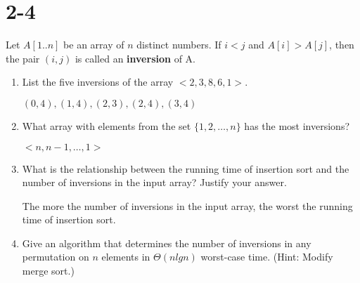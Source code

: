 \documentclass[a4paper, 11pt, UTF8]{article}
\begin{document}
\section*{2-4}
Let $A[1..n]$ be an array of $n$ distinct numbers. If $i<j$ and $A[i] > A[j]$, 
then the pair $(i, j)$ is called an \textbf{inversion} of A.

\begin{enumerate}
    \item List the five inversions of the array $<2, 3, 8, 6,1>$.

        $(0, 4), (1, 4), (2, 3), (2, 4), (3, 4)$

    \item What array with elements from the set  $\{1, 2, \dots, n\}$ has the most
        inversions?

        $<n, n-1, \dots, 1>$
    \item What is the relationship between  the running time of insertion sort
        and the number of inversions in the input array? Justify your answer.

        The more the number of inversions in the input array, the worst the 
        running time of insertion sort.

    \item Give an algorithm that determines the number of inversions in any 
        permutation on $n$ elements in $\Theta(nlgn)$ worst-case time. (Hint:
        Modify merge sort.)

\end{enumerate}
\end{document}
